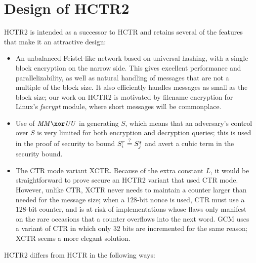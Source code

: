 \documentclass[hctr2.tex]{subfiles}
\begin{document}
\section{Design of HCTR2}\label{design}
HCTR2 is intended as a successor to HCTR and retains several of the
features that make it an attractive design:
\begin{itemize}
    \item An unbalanced Feistel-like network based on universal
    hashing, with a single block encryption on the narrow side.
    This gives excellent performance and parallelizability,
    as well as natural handling of messages that are not
    a multiple of the block size.
    It also efficiently handles messages as small as the
    block size; our work on HCTR2 is motivated by
    filename encryption for Linux's
    \emph{fscrypt} module\cite{fscrypt}, where
    short messages will be commonplace.
    \item Use of \(\MM \xor \UU\) in generating \(S\), which means
    that an adversary's control over \(S\) is very limited for both
    encryption and decryption queries; this is used in the
    proof of security to bound \(S_i^r \stackrel{\text{?}}{=} S_j^s\)
    and avert a cubic term in the security bound.
    \item The CTR mode variant XCTR\@.
    Because of the extra constant \(L\), it would be straightforward
    to prove secure an HCTR2 variant that used CTR mode.
    However, unlike CTR, XCTR
    never needs to maintain a counter larger
    than needed for the message size;
    when a 128-bit nonce is used, CTR 
    must use a 128-bit counter, and is
    at risk of implementations
    whose flaws only manifest on the
    rare occasions that a counter overflows
    into the next word.
    GCM\cite{gcm} uses a variant of CTR
    in which only 32 bits are incremented
    for the same reason;
    XCTR seems a more elegant solution.
\end{itemize}

HCTR2 differs from HCTR in the following ways:
\end{document}
